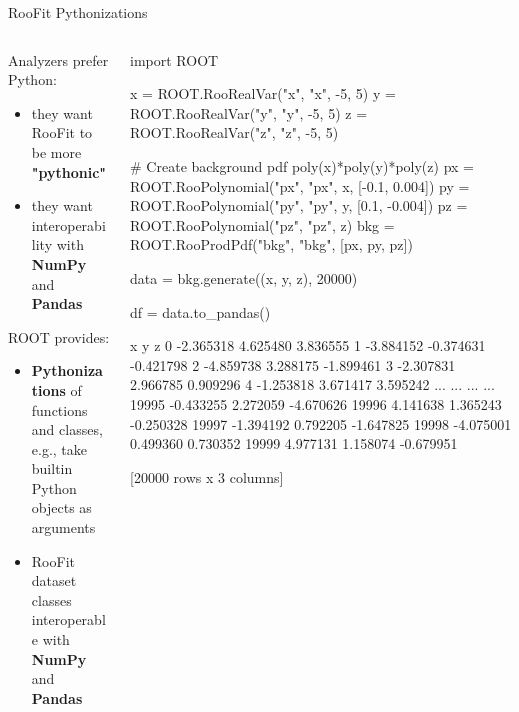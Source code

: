 \documentclass[aspectratio=169]{beamer}
\begin{document}
\begin{frame}[fragile]{RooFit Pythonizations}
\begin{columns}
    \begin{column}{0.5\textwidth}
Analyzers prefer Python:
    \begin{itemize}
        \item they want RooFit to be more \textbf{"pythonic"}
        \item they want interoperability with \textbf{NumPy} and \textbf{Pandas}
    \end{itemize}
\vspace{0.5cm}
ROOT provides:

    \begin{itemize}
        \item \textbf{Pythonizations} of functions and classes, e.g., take builtin Python objects as arguments
    \item RooFit dataset classes interoperable with \textbf{NumPy} and \textbf{Pandas}
    \end{itemize}
\end{column}
    \begin{column}{0.5\textwidth}
    \vspace{-0.5cm}
    \begin{pycelltiny}
import ROOT

x = ROOT.RooRealVar("x", "x", -5, 5)
y = ROOT.RooRealVar("y", "y", -5, 5)
z = ROOT.RooRealVar("z", "z", -5, 5)

# Create background pdf poly(x)*poly(y)*poly(z)
px = ROOT.RooPolynomial("px", "px", x, [-0.1, 0.004])
py = ROOT.RooPolynomial("py", "py", y, [0.1, -0.004])
pz = ROOT.RooPolynomial("pz", "pz", z)
bkg = ROOT.RooProdPdf("bkg", "bkg", [px, py, pz])

data = bkg.generate((x, y, z), 20000)

df = data.to_pandas()
    \end{pycelltiny}
    \begin{myterminaltiny}
              x         y         z
0     -2.365318  4.625480  3.836555
1     -3.884152 -0.374631 -0.421798
2     -4.859738  3.288175 -1.899461
3     -2.307831  2.966785  0.909296
4     -1.253818  3.671417  3.595242
...         ...       ...       ...
19995 -0.433255  2.272059 -4.670626
19996  4.141638  1.365243 -0.250328
19997 -1.394192  0.792205 -1.647825
19998 -4.075001  0.499360  0.730352
19999  4.977131  1.158074 -0.679951

[20000 rows x 3 columns]
    \end{myterminaltiny}
\end{column}
\end{columns}
\end{frame}
\end{document}
